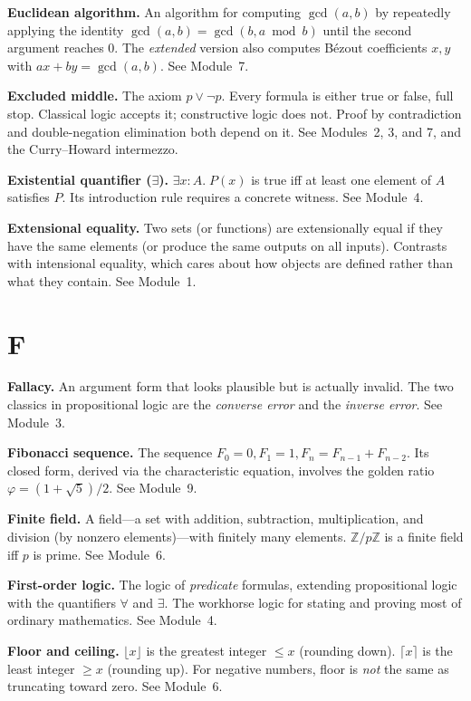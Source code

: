 \documentclass[11pt]{article}
\begin{document}
\textbf{Euclidean algorithm.} An algorithm for computing $\gcd(a, b)$ by repeatedly applying the identity $\gcd(a, b) = \gcd(b, a \bmod b)$ until the second argument reaches $0$. The \emph{extended} version also computes B\'ezout coefficients $x, y$ with $ax + by = \gcd(a, b)$. See Module~7.

\textbf{Excluded middle.} The axiom $p \vee \lnot p$. Every formula is either true or false, full stop. Classical logic accepts it; constructive logic does not. Proof by contradiction and double-negation elimination both depend on it. See Modules~2, 3, and 7, and the Curry--Howard intermezzo.

\textbf{Existential quantifier ($\exists$).} $\exists x : A.\; P(x)$ is true iff at least one element of $A$ satisfies $P$. Its introduction rule requires a concrete witness. See Module~4.

\textbf{Extensional equality.} Two sets (or functions) are extensionally equal if they have the same elements (or produce the same outputs on all inputs). Contrasts with intensional equality, which cares about how objects are defined rather than what they contain. See Module~1.

\section*{F}

\textbf{Fallacy.} An argument form that looks plausible but is actually invalid. The two classics in propositional logic are the \emph{converse error} and the \emph{inverse error}. See Module~3.

\textbf{Fibonacci sequence.} The sequence $F_0 = 0, F_1 = 1, F_n = F_{n-1} + F_{n-2}$. Its closed form, derived via the characteristic equation, involves the golden ratio $\varphi = (1 + \sqrt{5})/2$. See Module~9.

\textbf{Finite field.} A field---a set with addition, subtraction, multiplication, and division (by nonzero elements)---with finitely many elements. $\mathbb{Z}/p\mathbb{Z}$ is a finite field iff $p$ is prime. See Module~6.

\textbf{First-order logic.} The logic of \emph{predicate} formulas, extending propositional logic with the quantifiers $\forall$ and $\exists$. The workhorse logic for stating and proving most of ordinary mathematics. See Module~4.

\textbf{Floor and ceiling.} $\lfloor x \rfloor$ is the greatest integer $\leq x$ (rounding down). $\lceil x \rceil$ is the least integer $\geq x$ (rounding up). For negative numbers, floor is \emph{not} the same as truncating toward zero. See Module~6.
\end{document}
